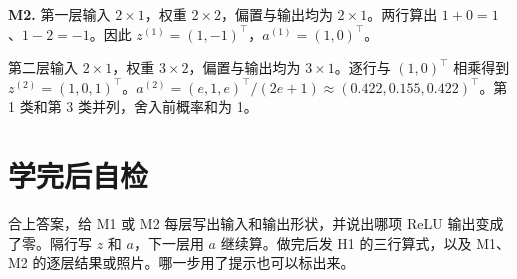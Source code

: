 \documentclass[UTF8,a4paper,11pt]{ctexart}
\begin{document}
\textbf{M2.} 第一层输入 $2\times1$，权重 $2\times2$，偏置与输出均为 $2\times1$。两行算出 $1+0=1$、$1-2=-1$。因此 $z^{(1)}=(1,-1)^\top$，$a^{(1)}=(1,0)^\top$。

第二层输入 $2\times1$，权重 $3\times2$，偏置与输出均为 $3\times1$。逐行与 $(1,0)^\top$ 相乘得到 $z^{(2)}=(1,0,1)^\top$。$a^{(2)}=(e,1,e)^\top/(2e+1)\approx(0.422,0.155,0.422)^\top$。第 1 类和第 3 类并列，舍入前概率和为 1。

\section{学完后自检}
合上答案，给 M1 或 M2 每层写出输入和输出形状，并说出哪项 ReLU 输出变成了零。隔行写 $z$ 和 $a$，下一层用 $a$ 继续算。做完后发 H1 的三行算式，以及 M1、M2 的逐层结果或照片。哪一步用了提示也可以标出来。
\end{document}
